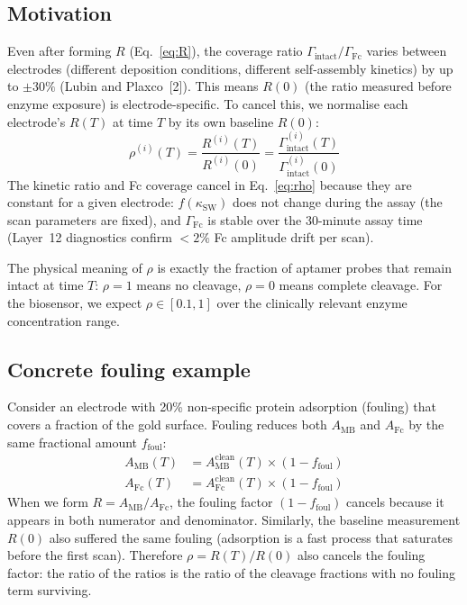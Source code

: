 \documentclass[10pt,a4paper]{article}
\numberwithin{equation}{section}
\newcommand{\cit}[1]{[#1]}
\newcommand{\AMB}{A_{\text{MB}}}
\newcommand{\AFc}{A_{\text{Fc}}}
\newcommand{\Gtot}{\Gamma_{\text{intact}}}
\begin{document}
\subsection{Motivation}

Even after forming $R$ (Eq.~\ref{eq:R}), the coverage ratio
$\Gtot/\Gamma_\text{Fc}$ varies between electrodes (different deposition
conditions, different self-assembly kinetics) by up to $\pm 30\%$ (Lubin
and Plaxco~\cit{2}). This means $R(0)$ (the ratio measured before enzyme
exposure) is electrode-specific. To cancel this, we normalise each
electrode's $R(T)$ at time $T$ by its own baseline $R(0)$:
\begin{equation}
  \boxed{
  \rho^{(i)}(T) = \frac{R^{(i)}(T)}{R^{(i)}(0)}
  = \frac{\Gtot^{(i)}(T)}{\Gtot^{(i)}(0)}
  }
  \label{eq:rho}
\end{equation}
The kinetic ratio and Fc coverage cancel in Eq.~\eqref{eq:rho} because they
are constant for a given electrode: $f(\kappa_\text{SW})$ does not change
during the assay (the scan parameters are fixed), and $\Gamma_\text{Fc}$
is stable over the 30-minute assay time (Layer~12 diagnostics confirm
$<2\%$ Fc amplitude drift per scan).

The physical meaning of $\rho$ is exactly the fraction of aptamer probes
that remain intact at time $T$: $\rho = 1$ means no cleavage, $\rho = 0$
means complete cleavage. For the biosensor, we expect $\rho \in [0.1, 1]$
over the clinically relevant enzyme concentration range.

\subsection{Concrete fouling example}

Consider an electrode with 20\% non-specific protein adsorption (fouling)
that covers a fraction of the gold surface. Fouling reduces both $\AMB$
and $\AFc$ by the same fractional amount $f_\text{foul}$:
\begin{align}
  \AMB(T) &= \AMB^\text{clean}(T) \times (1 - f_\text{foul})
  \label{eq:foul_MB}\\
  \AFc(T) &= \AFc^\text{clean}(T) \times (1 - f_\text{foul})
  \label{eq:foul_Fc}
\end{align}
When we form $R = \AMB/\AFc$, the fouling factor $(1-f_\text{foul})$
cancels because it appears in both numerator and denominator.
Similarly, the baseline measurement $R(0)$ also suffered the same
fouling (adsorption is a fast process that saturates before the first
scan). Therefore $\rho = R(T)/R(0)$ also cancels the fouling
factor: the ratio of the ratios is the ratio of the cleavage fractions
with no fouling term surviving.
\end{document}
